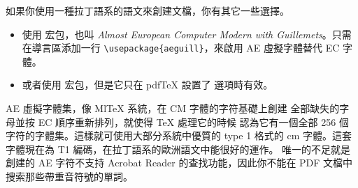 
如果你使用一種拉丁語系的語文來創建文檔，你有其它一些選擇。
\begin{itemize}
\item 使用  宏包，也叫 \emph{Almost European Computer Modern with
Guillemets}。只需在導言區添加一行 \verb+\usepackage{aeguill}+，來啟用 AE 虛擬字體替代 EC 字體。
\item 或者使用  宏包，但是它只在 pdf\TeX{} 設置了  選項時有效。
\end{itemize}


AE 虛擬字體集，像 {Ml\TeX} 系統，在 CM 字體的字符基礎上創建
全部缺失的字母並按 EC 順序重新排列，就使得 \TeX{} 處理它的時候
認為它有一個全部 256 個字符的字體集。這樣就可使用大部分系統中優質的 type
1 格式的 cm 字體。這套字體現在為 T1 編碼，在拉丁語系的歐洲語文中能很好的運作。
唯一的不足就是創建的 AE 字符不支持 Acrobat
Reader 的查找功能，因此你不能在 PDF 文檔中搜索那些帶重音符號的單詞。


